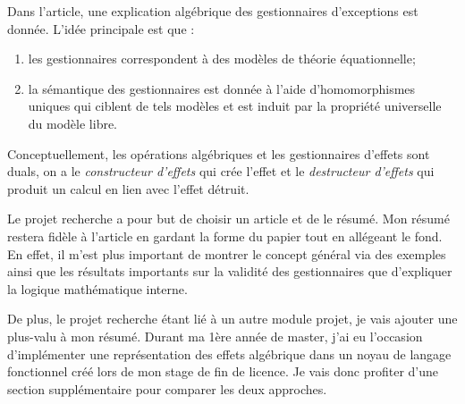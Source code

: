 	Dans l'article, une explication algébrique des gestionnaires d'exceptions est donnée. L'idée principale est que :
	\begin{enumerate}
		\item les gestionnaires correspondent à des modèles de théorie équationnelle;
		\item la sémantique des gestionnaires est donnée à l'aide d'homomorphismes uniques qui ciblent de tels modèles et est induit par la propriété universelle du modèle libre. 
	\end{enumerate}
		
	Conceptuellement, les opérations algébriques et les gestionnaires d'effets sont duals, on a le \textit{constructeur d'effets} qui crée l'effet et le \textit{destructeur d'effets} qui produit un calcul en lien avec l'effet détruit.
	\smallbreak
	
	Le projet recherche a pour but de choisir un article et de le résumé. Mon résumé restera fidèle à l'article en gardant
	la forme du papier tout en allégeant le fond. En effet, il m'est plus important de montrer le concept général via des exemples ainsi
	que les résultats importants sur la validité des gestionnaires que d'expliquer la logique mathématique interne.

	De plus, le projet recherche étant lié à un autre module projet, je vais ajouter une plus-valu à mon résumé. Durant ma 
	1ère année de master, j'ai eu l'occasion d'implémenter une représentation des effets algébrique dans un noyau de langage fonctionnel créé lors de mon stage de fin de licence. Je vais donc profiter d'une section supplémentaire pour comparer les deux approches.
	
	
